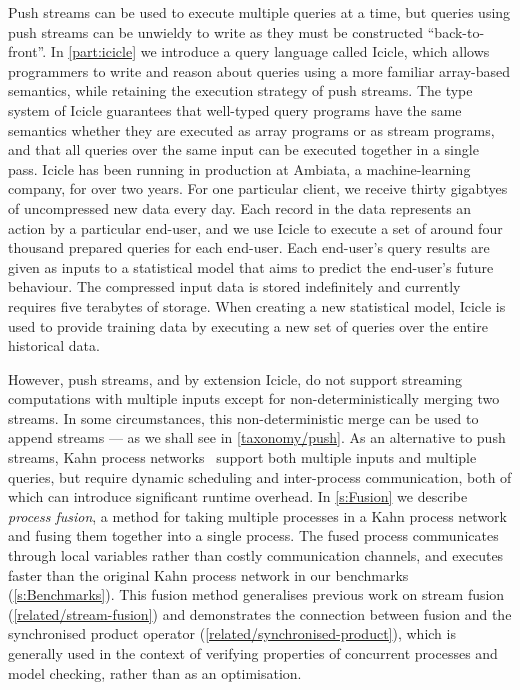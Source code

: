 Push streams can be used to execute multiple queries at a time, but queries using push streams can be unwieldy to write as they must be constructed ``back-to-front''.
In \cref{part:icicle} we introduce a query language called Icicle, which allows programmers to write and reason about queries using a more familiar array-based semantics, while retaining the execution strategy of push streams.
The type system of Icicle guarantees that well-typed query programs have the same semantics whether they are executed as array programs or as stream programs, and that all queries over the same input can be executed together in a single pass.
Icicle has been running in production at Ambiata, a machine-learning company, for over two years.
For one particular client, we receive thirty gigabtyes of uncompressed new data every day.
Each record in the data represents an action by a particular end-user, and we use Icicle to execute a set of around four thousand prepared queries for each end-user.
Each end-user's query results are given as inputs to a statistical model that aims to predict the end-user's future behaviour.
The compressed input data is stored indefinitely and currently requires five terabytes of storage.
When creating a new statistical model, Icicle is used to provide training data by executing a new set of queries over the entire historical data.

However, push streams, and by extension Icicle, do not support streaming computations with multiple inputs except for non-deterministically merging two streams.
In some circumstances, this non-deterministic merge can be used to append streams --- as we shall see in \cref{taxonomy/push}.
As an alternative to push streams, Kahn process networks~\citep{kahn1976coroutines} support both multiple inputs and multiple queries, but require dynamic scheduling and inter-process communication, both of which can introduce significant runtime overhead.
In \cref{s:Fusion} we describe \emph{process fusion}, a method for taking multiple processes in a Kahn process network and fusing them together into a single process.
The fused process communicates through local variables rather than costly communication channels, and executes faster than the original Kahn process network in our benchmarks (\cref{s:Benchmarks}).
This fusion method generalises previous work on stream fusion (\cref{related/stream-fusion}) and demonstrates the connection between fusion and the synchronised product operator (\cref{related/synchronised-product}), which is generally used in the context of verifying properties of concurrent processes and model checking, rather than as an optimisation.

